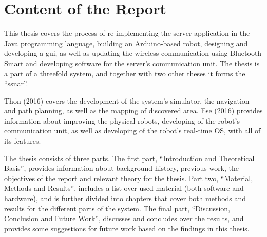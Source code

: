 \newpage
\section{Content of the Report}

This thesis covers the process of re-implementing the server application in the Java programming language, building an Arduino-based robot, designing and developing a \acrfull{gui}, as well as updating the wireless communication using Bluetooth Smart and developing software for the server's communication unit. The thesis is a part of a threefold system, and together with two other theses it forms the ``\acrfull{ssnar}''.

Thon (2016) covers the development of the system's simulator, the navigation and path planning, as well as the mapping of discovered area. Ese (2016) provides information about improving the physical robots, developing of the robot's communication unit, as well as developing of the robot's real-time OS, with all of its features.

The thesis consists of three parts. The first part, ``Introduction and Theoretical Basis'', provides information about background history, previous work, the objectives of the report and relevant theory for the thesis. Part two, ``Material, Methods and Results'', includes a list over used material (both software and hardware), and is further divided into chapters that cover both methods and results for the different parts of the system. The final part, ``Discussion, Conclusion and Future Work'', discusses and concludes over the results, and provides some suggestions for future work based on the findings in this thesis.